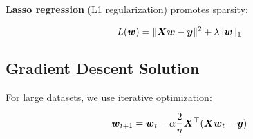\textbf{Lasso regression} (L1 regularization) promotes sparsity:

\begin{equation}
L(\boldsymbol{w}) = \|\boldsymbol{X}\boldsymbol{w} - \boldsymbol{y}\|^2 + \lambda \|\boldsymbol{w}\|_1
\end{equation}

\subsection{Gradient Descent Solution}

For large datasets, we use iterative optimization:

\begin{equation}
\boldsymbol{w}_{t+1} = \boldsymbol{w}_t - \alpha \frac{2}{n} \boldsymbol{X}^\top (\boldsymbol{X}\boldsymbol{w}_t - \boldsymbol{y})
\end{equation}

